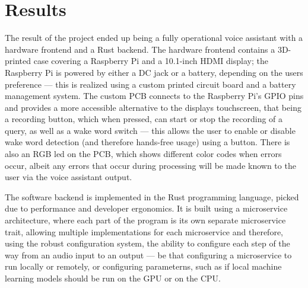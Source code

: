 \cleardoubleemptypage
\renewcommand*\chapterpagestyle{scrheadings}
\chapter{Results}
The result of the project ended up being a fully operational voice assistant with a hardware frontend and a Rust backend.
The hardware frontend contains a 3D-printed case covering a Raspberry Pi and a 10.1-inch HDMI display;
the Raspberry Pi is powered by either a DC jack or a battery, depending on the users preference ---
this is realized using a custom printed circuit board and a battery management system.
The custom PCB connects to the Raspberry Pi's GPIO pins and provides a more accessible alternative to the displays touchscreen,
that being a recording button, which when pressed, can start or stop the recording of a query,
as well as a wake word switch --- this allows the user to enable or disable wake word detection (and therefore hands-free usage) using a button.
There is also an RGB led on the PCB, which shows different color codes when errors occur, albeit any errors
that occur during processing will be made known to the user via the voice assistant output.

The software backend is implemented in the Rust programming language, picked due to performance and developer ergonomics.
It is built using a microservice architecture, where each part of the program is its own separate microservice trait,
allowing multiple implementations for each microservice and therefore, using the robust configuration system,
the ability to configure each step of the way from an audio input to an output --- be that configuring
a microservice to run locally or remotely, or configuring parameterns, such as if local machine learning models
should be run on the GPU or on the CPU.

